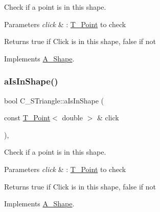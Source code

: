 Check if a point is in this shape. 


\begin{DoxyParams}{Parameters}
{\em click} & \+: \hyperlink{classT__Point}{T\+\_\+\+Point} to check \\
\hline
\end{DoxyParams}
\begin{DoxyReturn}{Returns}
true if Click is in this shape, false if not 
\end{DoxyReturn}


Implements \hyperlink{classA__Shape_a63f825cbc9780208d9a137f5c14917d0}{A\+\_\+\+Shape}.

\mbox{\label{classC__STriangle_a3bc82d7ea53a6a058b9fb49bbd89282c}} 
\subsubsection{\texorpdfstring{a\+Is\+In\+Shape()}{aIsInShape()}\hspace{0.1cm}{\footnotesize\ttfamily [2/2]}}
{\footnotesize\ttfamily bool C\+\_\+\+S\+Triangle\+::a\+Is\+In\+Shape (\begin{DoxyParamCaption}\item[{const \hyperlink{classT__Point}{T\+\_\+\+Point}$<$ double $>$ \&}]{click }\end{DoxyParamCaption})\hspace{0.3cm}{\ttfamily [override]}, {\ttfamily [virtual]}}



Check if a point is in this shape. 


\begin{DoxyParams}{Parameters}
{\em click} & \+: \hyperlink{classT__Point}{T\+\_\+\+Point} to check \\
\hline
\end{DoxyParams}
\begin{DoxyReturn}{Returns}
true if Click is in this shape, false if not 
\end{DoxyReturn}


Implements \hyperlink{classA__Shape_a63f825cbc9780208d9a137f5c14917d0}{A\+\_\+\+Shape}.

\mbox{\label{classC__STriangle_a81494ca6aa210194c55e884b0ff68db1}} 
